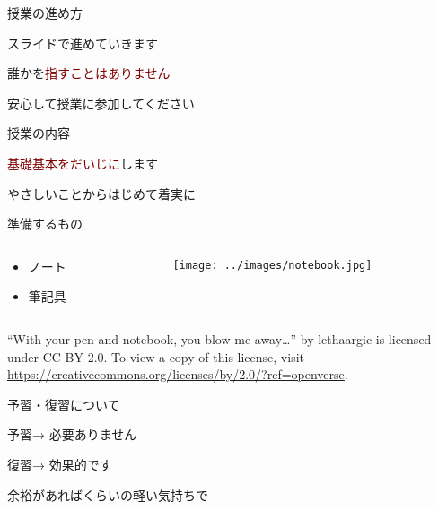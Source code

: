 \documentclass[
  ignorenonframetext,
  aspectratio=169,
  xcolor=dvipsnames]{beamer}
\begin{document}
\begin{frame}{授業の進め方}
\label{ux6388ux696dux306eux9032ux3081ux65b9}
\LARGE

スライドで進めていきます

\pause
\vfill

\raggedleft

誰かを\textcolor{Maroon}{指すことはありません}

\pause

安心して授業に参加してください
\end{frame}

\begin{frame}{授業の内容}
\label{ux6388ux696dux306eux5185ux5bb9}
\LARGE

\textcolor{Maroon}{基礎基本をだいじに}します

\vfill

\raggedleft

やさしいことからはじめて着実に
\end{frame}

\begin{frame}{準備するもの}
\label{ux6e96ux5099ux3059ux308bux3082ux306e}
\LARGE
\begin{columns}
\begin{column}{.25\textwidth}
  \begin{itemize}
    \item ノート
    \item 筆記具
  \end{itemize}
\end{column}
\begin{column}{.7\textwidth}
\raggedleft
\texttt{[image: ../images/notebook.jpg]}
\end{column}
\end{columns}
\tiny
\raggedleft

``With your pen and notebook, you blow me away\ldots{}'' by lethaargic
is licensed under CC BY 2.0. To view a copy of this license, visit
\url{https://creativecommons.org/licenses/by/2.0/?ref=openverse}.
\end{frame}

\begin{frame}{予習・復習について}
\label{ux4e88ux7fd2ux5fa9ux7fd2ux306bux3064ux3044ux3066}
\LARGE

予習\pause → 必要ありません

\pause

\bigskip

復習\pause → 効果的です

\phantom{　　　　}余裕があればくらいの軽い気持ちで
\end{frame}
\end{document}
